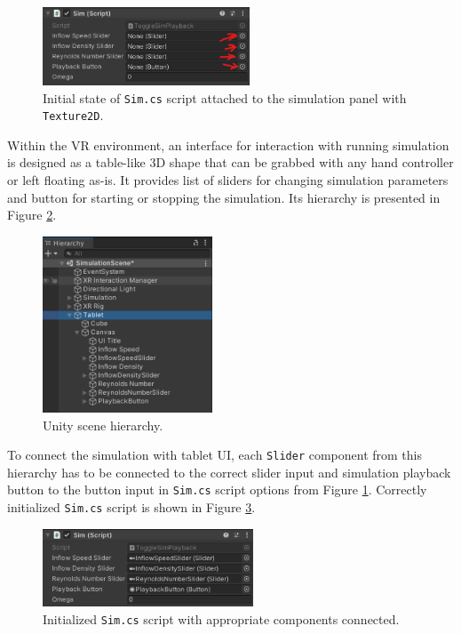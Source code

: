\begin{figure}[!ht]
	\centering
	\includegraphics[width=0.55\textwidth]{figures/sim-script.png}
	\caption{Initial state of \texttt{Sim.cs} script attached to the simulation panel with \texttt{Texture2D}.}
	\label{fig:sim-script}
\end{figure}

Within the VR environment, an interface for interaction with running simulation is designed as a table-like 3D shape that can be grabbed with any hand controller or left floating as-is. It provides list of sliders for changing simulation parameters and button for starting or stopping the simulation. Its hierarchy is presented in Figure \ref{fig:unity-scene-hierarchy}.

\begin{figure}[!ht]
	\centering
	\includegraphics[width=0.45\textwidth]{figures/tablet-ui-hierarchy.png}
	\caption{Unity scene hierarchy.}
	\label{fig:unity-scene-hierarchy}
\end{figure}

To connect the simulation with tablet UI, each \texttt{Slider} component from this hierarchy has to be connected to the correct slider input and simulation playback button to the button input in \texttt{Sim.cs} script options from Figure \ref{fig:sim-script}. Correctly initialized \texttt{Sim.cs} script is shown in Figure \ref{fig:sim-script-filled}.

\begin{figure}[!ht]
	\centering
	\includegraphics[width=0.56\textwidth]{figures/sim-script-filled.png}
	\caption{Initialized \texttt{Sim.cs} script with appropriate components connected.}
	\label{fig:sim-script-filled}
\end{figure}

